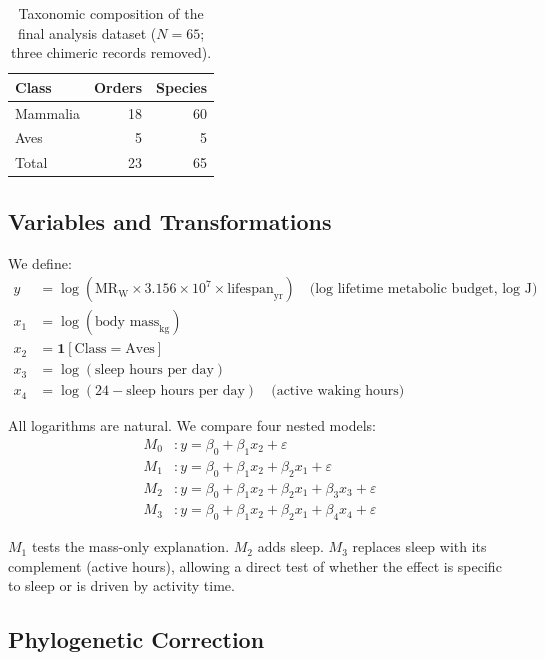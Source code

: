 \documentclass{article}
\begin{document}
\begin{table}[t]
  \caption{Taxonomic composition of the final analysis dataset ($N = 65$; three chimeric records removed).}
  \label{tab:species_summary}
  \centering
  \small
  \begin{tabular}{lrr}
    \toprule
    Class & Orders & Species \\
    \midrule
    Mammalia & 18 & 60 \\
    Aves     &  5 &  5 \\
    \midrule
    Total    & 23 & 65 \\
    \bottomrule
  \end{tabular}
\end{table}

\subsection{Variables and Transformations}
\label{sec:variables}

We define:
\begin{align*}
  y   &= \log(\text{MR}_{\text{W}} \times 3.156 \times 10^7 \times \text{lifespan}_{\text{yr}}) \quad\text{(log lifetime metabolic budget, log J)}\\
  x_1 &= \log(\text{body mass}_{\text{kg}}) \\
  x_2 &= \mathbf{1}[\text{Class} = \text{Aves}] \\
  x_3 &= \log(\text{sleep hours per day}) \\
  x_4 &= \log(24 - \text{sleep hours per day}) \quad\text{(active waking hours)}
\end{align*}

All logarithms are natural. We compare four nested models:
\begin{align*}
  M_0 &: y = \beta_0 + \beta_1 x_2 + \varepsilon \\
  M_1 &: y = \beta_0 + \beta_1 x_2 + \beta_2 x_1 + \varepsilon \\
  M_2 &: y = \beta_0 + \beta_1 x_2 + \beta_2 x_1 + \beta_3 x_3 + \varepsilon \\
  M_3 &: y = \beta_0 + \beta_1 x_2 + \beta_2 x_1 + \beta_4 x_4 + \varepsilon
\end{align*}

$M_1$ tests the mass-only explanation. $M_2$ adds sleep. $M_3$ replaces sleep with its
complement (active hours), allowing a direct test of whether the effect is specific to
sleep or is driven by activity time.

\subsection{Phylogenetic Correction}
\label{sec:pgls}
\end{document}
